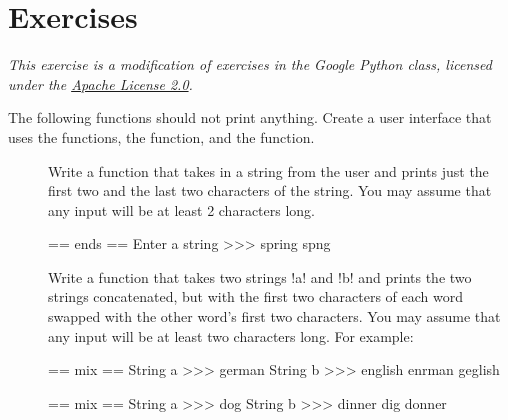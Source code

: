 \documentclass[11pt]{cselabheader}
\begin{document}
\section{Exercises}\label{exercises}
\begin{ex}[stringfun.py]
  \emph{This exercise is a modification of exercises in the Google Python
    class, licensed under the
    \href{http://www.apache.org/licenses/LICENSE-2.0.html}{Apache License 2.0}.}

The following functions should not print anything.
Create a user interface that uses the functions, the 
function, and the  function.

\begin{description}
  \item[]
    Write a function that takes in a string from the user and
    prints just the first two and the last two characters of the string.
    You may assume that any input will be at least 2 characters long.

    \begin{verbatimcode}
      == ends ==
      Enter a string >>> spring
      spng
    \end{verbatimcode}

  \item[]
    Write a function that takes two strings \pythoninline!a! and
    \pythoninline!b! and prints the two strings concatenated, but with the first
    two characters of each word swapped with the other word's first two
    characters. You may assume that any input will be at least two characters
    long.
    For example:

    \begin{verbatimcode}
      == mix ==
      String a >>> german
      String b >>> english
      enrman geglish
    \end{verbatimcode}

    \begin{verbatimcode}
      == mix ==
      String a >>> dog
      String b >>> dinner
      dig donner
    \end{verbatimcode}


\end{description}
\end{ex}
\end{document}
